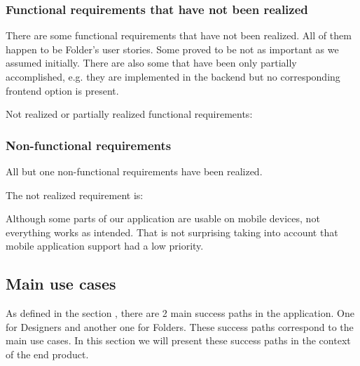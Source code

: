 \subsubsection{Functional requirements that have not been realized}

There are some functional requirements that have not been realized.
All of them happen to be Folder's user stories.
Some proved to be not as important as we assumed initially.
There are also some that have been only partially accomplished, e.g. they are 
implemented in the backend but no corresponding frontend option is present.
\smallskip

Not realized or partially realized functional requirements:
\begin{enumerate}
	\setcounter{enumi}{12}

	
	\setcounter{enumi}{19}
\end{enumerate}

\subsubsection{Non-functional requirements}

All but one non-functional requirements have been realized.

The not realized requirement is:
\begin{enumerate}
	\setcounter{enumi}{4}
\end{enumerate}

Although some parts of our application are usable on mobile devices, 
not everything works as intended. That is not surprising taking into account that
mobile application support had a low priority.


\subsection{Main use cases}

As defined in the section , there are 2 main 
success paths in the application.
One for Designers and another one for Folders.
These success paths correspond to the main use cases.
In this section we will present these success paths in the context of the end product.


